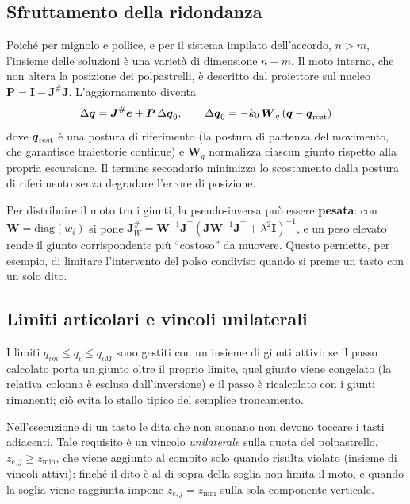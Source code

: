 \subsection{Sfruttamento della ridondanza}

Poiché per mignolo e pollice, e per il sistema impilato dell'accordo, $n>m$, l'insieme delle soluzioni è una varietà di dimensione $n-m$. Il moto interno, che non altera la posizione dei polpastrelli, è descritto dal proiettore sul nucleo $\boldsymbol P=\boldsymbol I-\boldsymbol J^{\#}\boldsymbol J$. L'aggiornamento diventa
\begin{equation}
    \Delta\boldsymbol q=\boldsymbol J^{\#}\boldsymbol e+\boldsymbol P\,\Delta\boldsymbol q_0,
    \qquad
    \Delta\boldsymbol q_0=-k_0\,\boldsymbol W_q\,(\boldsymbol q-\boldsymbol q_{\rm rest})
\end{equation}
dove $\boldsymbol q_{\rm rest}$ è una postura di riferimento (la postura di partenza del movimento, che garantisce traiettorie continue) e $\boldsymbol W_q$ normalizza ciascun giunto rispetto alla propria escursione. Il termine secondario minimizza lo scostamento dalla postura di riferimento senza degradare l'errore di posizione.

Per distribuire il moto tra i giunti, la pseudo-inversa può essere \textbf{pesata}: con $\boldsymbol W=\mathrm{diag}(w_i)$ si pone $\boldsymbol J^{\#}_W=\boldsymbol W^{-1}\boldsymbol J^\top(\boldsymbol J\boldsymbol W^{-1}\boldsymbol J^\top+\lambda^2\boldsymbol I)^{-1}$, e un peso elevato rende il giunto corrispondente più ``costoso'' da muovere. Questo permette, per esempio, di limitare l'intervento del polso condiviso quando si preme un tasto con un solo dito.

\subsection{Limiti articolari e vincoli unilaterali}

I limiti $q_{im}\le q_i\le q_{iM}$ sono gestiti con un insieme di giunti attivi: se il passo calcolato porta un giunto oltre il proprio limite, quel giunto viene congelato (la relativa colonna è esclusa dall'inversione) e il passo è ricalcolato con i giunti rimanenti; ciò evita lo stallo tipico del semplice troncamento.

Nell'esecuzione di un tasto le dita che non suonano non devono toccare i tasti adiacenti. Tale requisito è un vincolo \emph{unilaterale} sulla quota del polpastrello, $z_{e,j}\ge z_{\min}$, che viene aggiunto al compito solo quando risulta violato (insieme di vincoli attivi): finché il dito è al di sopra della soglia non limita il moto, e quando la soglia viene raggiunta impone $z_{e,j}=z_{\min}$ sulla sola componente verticale.

